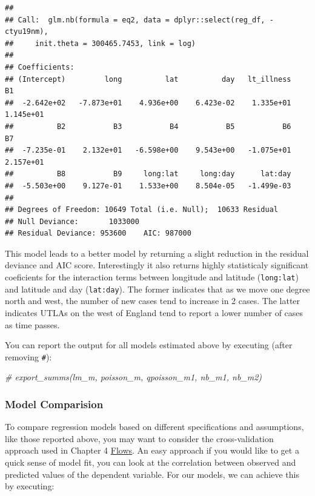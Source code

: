 \documentclass[
]{book}
\newenvironment{Shaded}{\begin{snugshade}}{\end{snugshade}}
\newcommand{\CommentTok}[1]{\textcolor[rgb]{0.56,0.35,0.01}{\textit{#1}}}
\begin{document}
\begin{verbatim}
## 
## Call:  glm.nb(formula = eq2, data = dplyr::select(reg_df, -ctyu19nm), 
##     init.theta = 300465.7453, link = log)
## 
## Coefficients:
## (Intercept)         long          lat          day   lt_illness           B1  
##  -2.642e+02   -7.873e+01    4.936e+00    6.423e-02    1.335e+01    1.145e+01  
##          B2           B3           B4           B5           B6           B7  
##  -7.235e-01    2.132e+01   -6.598e+00    9.543e+00   -1.075e+01    2.157e+01  
##          B8           B9     long:lat     long:day      lat:day  
##  -5.503e+00    9.127e-01    1.533e+00    8.504e-05   -1.499e-03  
## 
## Degrees of Freedom: 10649 Total (i.e. Null);  10633 Residual
## Null Deviance:       1033000 
## Residual Deviance: 953600    AIC: 987000
\end{verbatim}

This model leads to a better model by returning a slight reduction in the residual deviance and AIC score. Interestingly it also returns highly statisticaly significant coeficients for the interaction terms between longitude and latitude (\texttt{long:lat}) and latitude and day (\texttt{lat:day}). The former indicates that as we move one degree north and west, the number of new cases tend to increase in 2 cases. The latter indicates UTLAs on the west of England tend to report a lower number of cases as time passes.

You can report the output for all models estimated above by executing (after removing \texttt{\#}):

\begin{Shaded}
\begin{Highlighting}[]
\CommentTok{# export_summs(lm_m, poisson_m, qpoisson_m1, nb_m1, nb_m2)}
\end{Highlighting}
\end{Shaded}

\hypertarget{model-comparision}{%
\subsubsection{Model Comparision}\label{model-comparision}}

To compare regression models based on different specifications and assumptions, like those reported above, you may want to consider the cross-validation approach used in Chapter 4 \protect\hyperlink{flows}{Flows}. An easy approach if you would like to get a quick sense of model fit, you can look at the correlation between observed and predicted values of the dependent variable. For our models, we can achieve this by executing:
\end{document}

